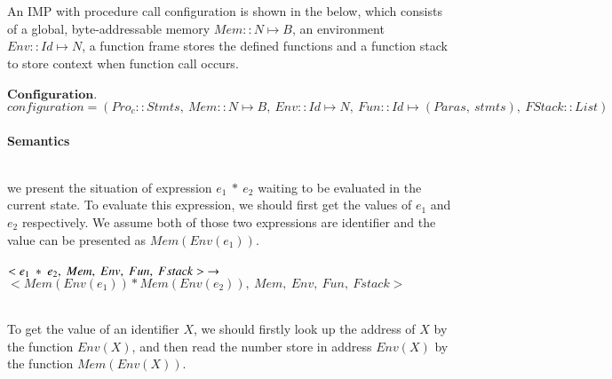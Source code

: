 \documentclass[conference]{IEEEtran}
\begin{document}
\par An IMP with procedure call configuration is shown in the below, which consists of a global, byte-addressable memory $Mem::N\mapsto B$, an environment $Env::Id\mapsto N$, a function frame stores the defined functions and a function stack to store context when function call occurs. \\ \\
$\textbf{Configuration.}$\\
$configuration=(Pro_c::Stmts,~Mem::N\mapsto B,~Env::Id\mapsto N,~Fun::Id\mapsto (Paras,~stmts),~FStack::List)$\\ \\
\textbf{Semantics}\\ \\
\par we present the situation of expression $e_1~*~e_2$ waiting to be evaluated in the current state. To evaluate this expression, we should first get the values of $e_1$ and $e_2$ respectively. We assume both of those two expressions are identifier and the value can be presented as $Mem(Env(e_1))$.  \\ \\
$<e_1~*~e_2,~Mem,~Env,~Fun,~Fstack>~\rightarrow\\ \\$
$<Mem(Env(e_1))*Mem(Env(e_2)),~Mem,~Env,~Fun,~Fstack>$\\ \\
\par To get the value of an identifier $X$, we should firstly look up the address of $X$ by the function $Env(X)$, and then read the number store in address $Env(X)$ by the function $Mem(Env(X))$. \\ \\
\end{document}
